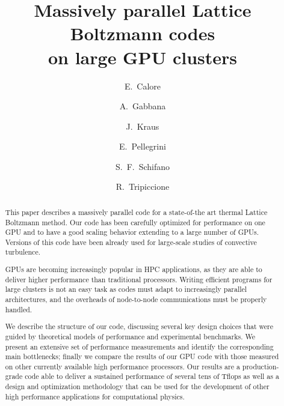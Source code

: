 \documentclass{elsarticle}
\begin{document}
\begin{frontmatter}

\title{Massively parallel Lattice Boltzmann codes \\on large GPU clusters}

\author[lab1]{E.~Calore}
\author[lab2]{A.~Gabbana}
\author[lab3]{J.~Kraus}
\author[lab2]{E.~Pellegrini}


\author[lab1]{S.~F.~Schifano}

\author[lab1]{R.~Tripiccione}

\address[lab1]{Universit\`a di Ferrara and INFN-Ferrara, via Saragat 1, I-44122 Ferrara, ITALY}
\address[lab2]{Universit\`a di Ferrara, via Saragat 1, I-44122 Ferrara, ITALY}
\address[lab3]{NVIDIA GmbH, Adenauerstr. 20 A4 D-52146 W\"urselen, GERMANY}

  
\begin{abstract}

This paper describes  a massively
parallel code for a state-of-the art thermal Lattice Boltzmann method. 
%
Our code has been carefully optimized for performance on one
GPU and to have a good scaling behavior extending to a large number of GPUs.
%
Versions of this code have been already used for large-scale studies of
convective turbulence.

GPUs are becoming increasingly popular in HPC applications, as they are 
able to deliver higher performance than traditional processors.
%
Writing efficient programs for large clusters is not an easy task 
as codes must adapt to increasingly parallel architectures, and the 
overheads of node-to-node communications must be properly handled.

We describe the structure of our code, discussing several key
design choices that were guided by theoretical models of performance 
and experimental benchmarks. 
%
We present an extensive set of performance measurements and identify the 
corresponding main bottlenecks; finally we compare the results of our GPU 
code with those measured on other currently available high performance processors.
%
Our results are a production-grade code able to deliver a sustained
performance of several tens of Tflops as well as a design and optimization
methodology that can be used for the development of other high performance
applications for computational physics.


\end{abstract}
\end{frontmatter}
\end{document}
